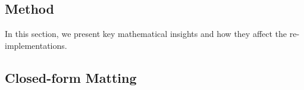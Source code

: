 \documentclass{article}
\theoremstyle{definition}
\begin{document}
\begin{multicols}{2}[]




\section{Method}


In this section, we present key mathematical insights and how they affect the re-implementations.

\subsection{Closed-form Matting}\label{s3-closed-form-matting}


\end{multicols}
\end{document}
